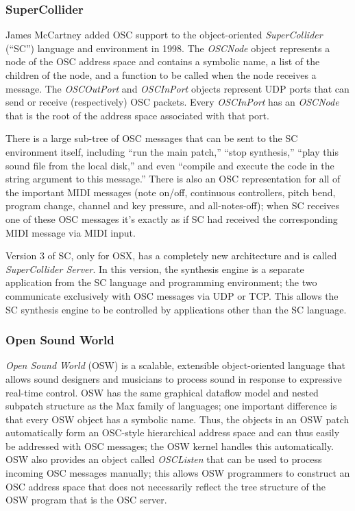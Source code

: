 \subsubsection{SuperCollider}

James McCartney added OSC support to the object-oriented \textit{SuperCollider}
(``SC'') language and environment \cite{McCartney:2000} in 1998.  The \textit{OSCNode} object
represents a node of the OSC address space and contains a symbolic name, a list
of the children of the node, and a function to be called when the node receives a
message. The \textit{OSCOutPort} and \textit{OSCInPort} objects represent UDP
ports that can send or receive (respectively) OSC packets.  Every
\textit{OSCInPort} has an \textit{OSCNode} that is the root of the address space
associated with that port.

There is a large sub-tree of OSC messages that can be sent to the SC environment
itself, including ``run the main patch,'' ``stop synthesis,'' ``play this sound
file from the local disk,'' and even ``compile and execute the code in the string
argument to this message.''  There is also an OSC representation for all of the
important MIDI messages (note on/off, continuous controllers, pitch bend, program
change, channel and key pressure,  and all-notes-off); when SC receives one of
these OSC messages it's exactly as if SC had received the corresponding MIDI
message via MIDI input.

Version 3 of SC, only for OSX, has a completely new architecture and is called
\textit{SuperCollider Server}.  In this version, the synthesis engine is a
separate application from the SC language and programming environment; the two
communicate exclusively with OSC messages via UDP or TCP.  This allows the SC
synthesis engine to be controlled by applications other than the SC language.

\subsubsection{Open Sound World}

\textit{Open Sound World} (OSW) \cite{Chaudhary:1999} is a scalable, extensible object-oriented
language that allows sound designers and musicians to process sound in response
to expressive real-time control.  OSW has the same graphical dataflow model and
nested subpatch structure as the Max family of languages; one important
difference is that every OSW object has a symbolic name.  Thus, the objects in an
OSW patch automatically form an OSC-style hierarchical address space and can thus
easily be addressed with OSC messages; the OSW kernel handles this automatically.
 OSW also provides an object called \textit{OSCListen} that can be used to
process incoming OSC messages manually; this allows OSW programmers to construct
an OSC address space that does not necessarily reflect the tree structure of the
OSW program that is the OSC server.

